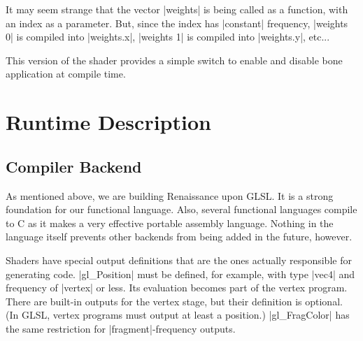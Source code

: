 \documentclass[review]{acmsiggraph}      %
\begin{document}
It may seem strange that the vector |weights| is being called as a
function, with an index as a parameter.  But, since the index has
|constant| frequency, |weights 0| is compiled into |weights.x|,
|weights 1| is compiled into |weights.y|, etc...

This version of the shader provides a simple switch to enable and
disable bone application at compile time.

\section{Runtime Description}

\subsection{Compiler Backend}

As mentioned above, we are building Renaissance upon GLSL.  It is a
strong foundation for our functional language.  Also, several
functional languages compile to C as it makes a very effective
portable assembly language.  Nothing in the language itself prevents
other backends from being added in the future, however.

Shaders have special output definitions that are the ones actually
responsible for generating code.  |gl_Position| must be defined, for
example, with type |vec4| and frequency of |vertex| or less.  Its
evaluation becomes part of the vertex program.  There are built-in
outputs for the vertex stage, but their definition is optional.  (In
GLSL, vertex programs must output at least a position.)
|gl_FragColor| has the same restriction for |fragment|-frequency
outputs.
\end{document}
